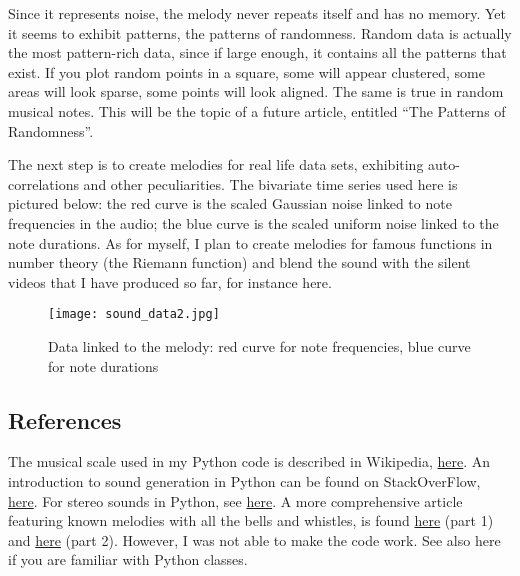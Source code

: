 \documentclass[oneside,10pt]{book}
\begin{document}
Since it represents noise, the melody never repeats itself and has no memory. Yet it seems to exhibit patterns, the patterns of randomness. Random data is actually the most pattern-rich data, since if large enough, it contains all the patterns that exist. If you plot random points in a square, some will appear clustered, some areas will look sparse, some points will look aligned. The same is true in random musical notes. This will be the topic of a future article, entitled “The Patterns of Randomness”.

The next step is to create melodies for real life data sets, exhibiting auto-correlations and other peculiarities. The bivariate time series used here is pictured below: the red curve is the scaled Gaussian noise linked to note frequencies in the audio; the blue curve is the scaled uniform noise linked to the note durations. As for myself, I plan to create melodies for famous functions in number theory (the Riemann function) and blend the sound with the silent videos that I have produced so far, for instance here.


\begin{figure}%
\centering
\texttt{[image: sound\_data2.jpg]}
\caption{Data linked to the melody: red curve for note frequencies, blue curve for note durations}
\label{fig:sound}
\end{figure}



\subsection{References}
The musical scale used in my Python code is described in Wikipedia, \href{https://en.wikipedia.org/wiki/Piano_key_frequencies}{here}. An introduction to sound generation in Python can be found on StackOverFlow, \href{https://stackoverflow.com/questions/40782159/writing-wav-file-using-python-numpy-array-and-wave-module}{here}. For stereo sounds in Python, see \href{https://www.tutorialspoint.com/read-and-write-wav-files-using-python-wave}{here}. A more comprehensive article featuring known melodies with all the bells and whistles, is found \href{https://towardsdatascience.com/music-in-python-2f054deb41f4}{here} (part 1) and \href{https://towardsdatascience.com/music-in-python-part-2-4f115be3c781}{here} (part 2). However, I was not able to make the code work. See also here if you are familiar with  Python classes.
\end{document}
